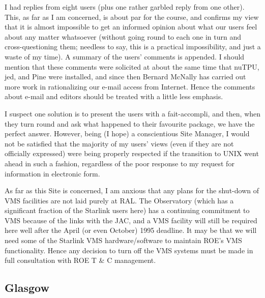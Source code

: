 I had replies from eight users (plus one rather garbled reply from one other).
This, as far as I am concerned, is about par for the course, and confirms my
view that it is almost impossible to get an informed opinion about what our
users feel about any matter whatsoever (without going round to each one in
turn and cross-questioning them; needless to say, this is a practical
impossibility, and just a waste of my time).
A summary of the users' comments is appended.
I should mention that these comments were solicited at about the same time
that nuTPU, jed, and Pine were installed, and since then Bernard McNally has
carried out more work in rationalizing our e-mail access from Internet.
Hence the comments about e-mail and editors should be treated with a little
less emphasis.

I suspect one solution is to present the users with a fait-accompli, and
then, when they turn round and ask what happened to their favourite package,
we have the perfect answer.
However, being (I hope) a conscientious Site Manager, I would not be
satisfied that the majority of my users' views (even if they are not
officially expressed) were being properly respected if the transition to
UNIX went ahead in such a fashion, regardless of the poor response to my
request for information in electronic form.

As far as this Site is concerned, I am anxious that any plans for the shut-down
of VMS facilities are not laid purely at RAL.
The Observatory (which has a significant fraction of the Starlink users here)
has a continuing commitment to VMS because of the links with the JAC, and a
VMS facility will still be required here well after the April (or even
October) 1995 deadline.
It may be that we will need some of the Starlink VMS hardware/software to
maintain ROE's VMS functionality.
Hence any decision to turn off the VMS systems must be made in full
consultation with ROE T \& C management.


\newpage
\subsection{Glasgow}

\renewcommand{\starsitename}{Glasgow}
\renewcommand{\starnodename}{uk.ac.gla.astro}

\renewcommand{\starunixdate}{1993 September 1}
\renewcommand{\starupdate}{1993 October 26}

\renewcommand{\starsitetelephone}{041 339 8855 Ext. 4268}
\renewcommand{\starsitefax}{041 334 9029}

